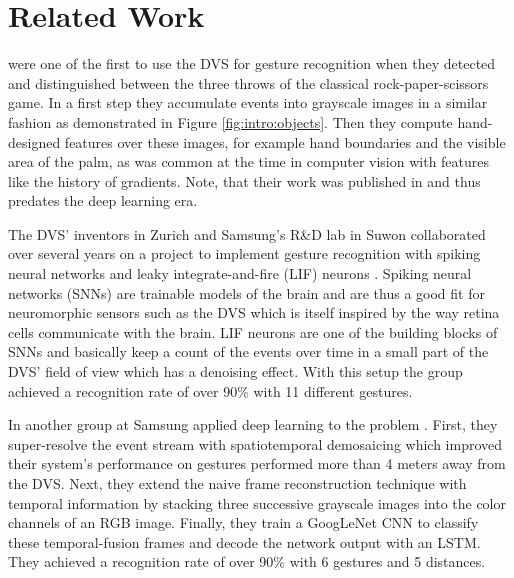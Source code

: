 \chapter{Related Work}
\label{cha:related-work}

\citeauthor{manualfeatures} were one of the first to use the DVS for gesture
recognition when they detected and distinguished between the three throws of the
classical rock-paper-scissors game. In a first step they accumulate events into
grayscale images in a similar fashion as demonstrated in Figure
\ref{fig:intro:objects}. Then they compute hand-designed features over these
images, for example hand boundaries and the visible area of the palm, as was
common at the time in computer vision with features like the history of
gradients. Note, that their work was published in \citeyear{manualfeatures} and
thus predates the deep learning era.

The DVS' inventors in Zurich and Samsung's R\&D lab in Suwon collaborated over
several years on a project to implement gesture recognition with spiking neural
networks and leaky integrate-and-fire (LIF) neurons
\cite{lif12,lifhmm12,livedemo}. Spiking neural networks (SNNs) are trainable
models of the brain and are thus a good fit for neuromorphic sensors such as the
DVS which is itself inspired by the way retina cells communicate with the brain.
LIF neurons are one of the building blocks of SNNs and basically keep a count of
the events over time in a small part of the DVS' field of view which has a
denoising effect. With this setup the group achieved a recognition rate of over
90\% with 11 different gestures.

In \citeyear{spatiotemporal} another group at Samsung applied deep learning to
the problem \cite{spatiotemporal}. First, they super-resolve the event stream
with spatiotemporal demosaicing which improved their system's performance on
gestures performed more than 4 meters away from the DVS. Next, they extend the
naive frame reconstruction technique with temporal information by stacking three
successive grayscale images into the color channels of an RGB image. Finally,
they train a GoogLeNet CNN to classify these temporal-fusion frames and decode
the network output with an LSTM. They achieved a recognition rate of over 90\%
with 6 gestures and 5 distances.
